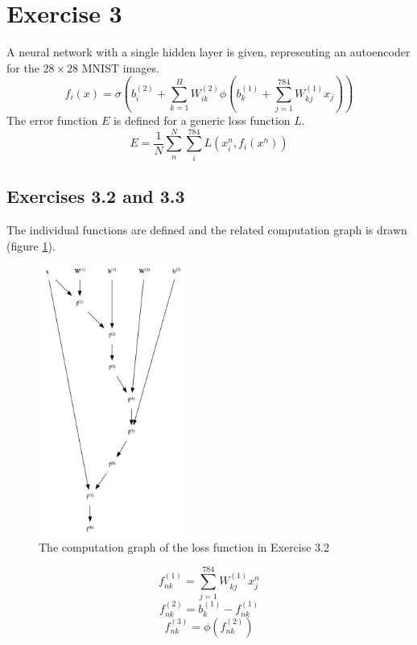 \documentclass[fleqn]{report}
\begin{document}
\section*{Exercise 3}
A neural network with a single hidden layer is given, representing an autoencoder for the $28 \times 28$ MNIST images.
\begin{equation}
    f_i(x) = \sigma \left (b^{(2)}_i + \sum_{k=1}^H W^{(2)}_{ik} \phi \left ( b^{(1)}_k + \sum_{j=1}^{784} W^{(1)}_{kj} x_j  \right ) \right )
\end{equation}
The error function $E$ is defined for a generic loss function $L$.
\begin{equation}
    E = \frac{1}{N} \sum_n^N \sum_i^{784} L\left(x^n_i, f_i\left(x^n\right)\right)
\end{equation}
\subsection*{Exercises 3.2 and 3.3}
The individual functions are defined and the related computation graph is drawn (figure \ref{fig:cg32}).
\begin{figure}
    \centering
    \includegraphics[height=3.5in]{cg32.png}
    \caption{The computation graph of the loss function in Exercise 3.2}
    \label{fig:cg32}
\end{figure}
\begin{equation}
    f^{(1)}_{nk} = \sum_{j=1}^{784} W^{(1)}_{kj} x^n_j
\end{equation}
\begin{equation}
    f^{(2)}_{nk} = b^{(1)}_k - f^{(1)}_{nk}
\end{equation}
\begin{equation}
    f^{(3)}_{nk} = \phi \left( f^{(2)}_{nk} \right )
\end{equation}
\end{document}

